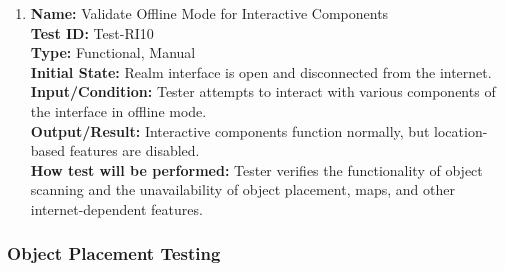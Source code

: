 \documentclass[12pt, titlepage]{article}
\begin{document}
\begin{enumerate}
\item \textbf{Name:} Validate Offline Mode for Interactive Components \label{itm:Test-RI10} \\
\textbf{Test ID:} Test-RI10 \\
\textbf{Type:} Functional, Manual \\
\textbf{Initial State:} Realm interface is open and disconnected from the internet. \\
\textbf{Input/Condition:} Tester attempts to interact with various components of the interface in offline mode. \\
\textbf{Output/Result:} Interactive components function normally, but location-based features are disabled. \\
\textbf{How test will be performed:} Tester verifies the functionality of object scanning and the unavailability of object placement, maps, and other internet-dependent features.

\end{enumerate}

\subsubsection{Object Placement Testing}
\end{document}
